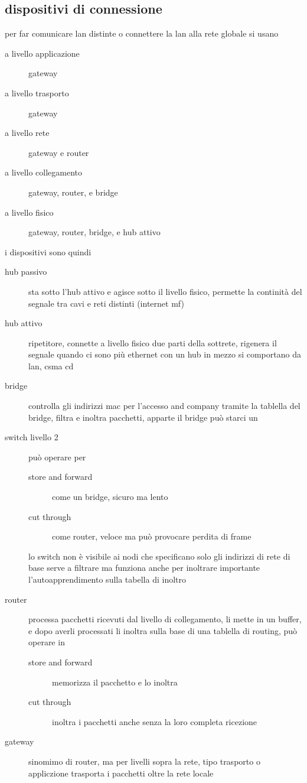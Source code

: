 \documentclass[11pt]{article}
\begin{document}
\subsection{dispositivi di connessione}
\label{sec:orge661a3b}
per far comunicare lan distinte o connettere la lan alla rete globale si usano
\begin{description}
\item[{a livello applicazione}] gateway
\item[{a livello trasporto}] gateway
\item[{a livello rete}] gateway e router
\item[{a livello collegamento}] gateway, router, e bridge
\item[{a livello fisico}] gateway, router, bridge, e hub attivo
\end{description}

i dispositivi sono quindi
\begin{description}
\item[{hub passivo}] sta sotto l'hub attivo e agisce sotto il livello fisico, permette la continità del segnale tra cavi e reti distinti (internet mf)
\item[{hub attivo}] ripetitore, connette a livello fisico due parti della sottrete, rigenera il segnale
quando ci sono più ethernet con un hub in mezzo si comportano da lan, csma cd
\item[{bridge}] controlla gli indirizzi mac per l'accesso and company tramite la tablella del bridge, filtra e inoltra pacchetti, apparte il bridge può starci un
\item[{switch livello 2}] può operare per
\begin{description}
\item[{store and forward}] come un bridge, sicuro ma lento
\item[{cut through}] come router, veloce ma può provocare perdita di frame
\end{description}
lo switch non è visibile ai nodi che specificano solo gli indirizzi di rete
di base serve a filtrare ma funziona anche per inoltrare
importante l'autoapprendimento sulla tabella di inoltro
\item[{router}] processa pacchetti ricevuti dal livello di collegamento, li mette in un buffer, e dopo averli processati li inoltra sulla base di una tablella di routing, può operare in
\begin{description}
\item[{store and forward}] memorizza il pacchetto e lo inoltra
\item[{cut through}] inoltra i pacchetti anche senza la loro completa ricezione
\end{description}
\item[{gateway}] sinomimo di router, ma per livelli sopra la rete, tipo trasporto o appliczione
trasporta i pacchetti oltre la rete locale
\end{description}
\end{document}
